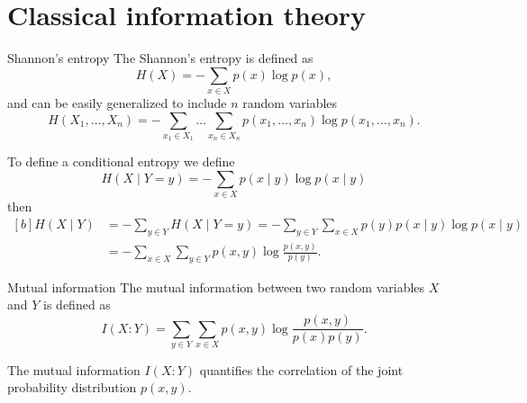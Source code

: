 \section{Classical information theory}
\begin{Definition}{Shannon's entropy}{}
	The Shannon's entropy is defined as
	\begin{equation*}
		H(X) = - \sum_{x \in X}p(x)\log p(x),
	\end{equation*}
	and can be easily generalized to include $n$ random variables
	\begin{equation*}
		H(X_1, \ldots, X_n) = -\sum_{x_1\in X_1}\ldots\sum_{x_n \in X_n}p(x_1, \ldots, x_n)\log p(x_1, \ldots, x_n).
	\end{equation*}
\end{Definition}
To define a conditional entropy we define
\begin{equation}
	H(X\mid Y=y) = -\sum_{x\in X}p(x\mid y) \log p(x\mid y)
\end{equation}
then
\begin{equation}
	\begin{aligned}[b]
		H(X\mid Y) & = -\sum_{y\in Y}H(X\mid Y=y) = -\sum_{y\in Y}\sum_{x\in X}p(y)p(x\mid y)\log p(x\mid y) \\
		           & = -\sum_{x \in X}\sum_{y \in Y}p(x,y)\log \frac{p(x,y)}{p(y)}.
	\end{aligned}
\end{equation}
\begin{Definition}{Mutual information}{}
	The mutual information between two random variables $X$ and $Y$ is defined as
	\begin{equation*}
		I(X\colon Y) = \sum_{y \in Y}\sum_{x\in X}p(x,y)\log \frac{p(x,y)}{p(x)p(y)}.
	\end{equation*}
\end{Definition}
\begin{proposition}
	The mutual information $I(X\colon Y)$ quantifies the correlation of the joint probability distribution $p(x,y)$.
\end{proposition}
